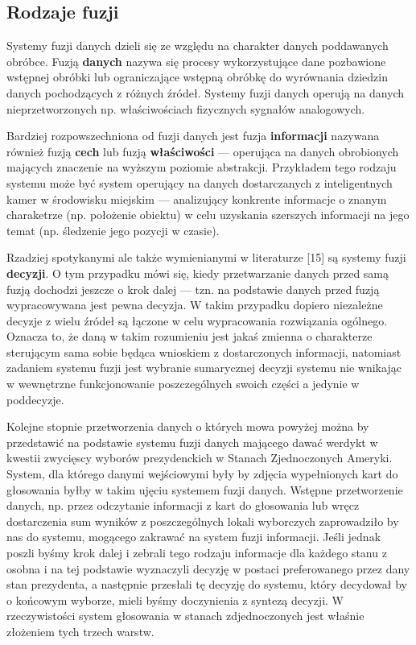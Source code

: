 \subsection{Rodzaje fuzji}
\par{
Systemy fuzji danych dzieli się ze względu na charakter danych poddawanych obróbce. Fuzją \textbf{danych} nazywa się procesy wykorzystujące dane pozbawione wstępnej obróbki lub ograniczające wstępną obróbkę do wyrównania dziedzin danych pochodzących z różnych źródeł. Systemy fuzji danych operują na danych nieprzetworzonych np. właściwościach fizycznych sygnałów analogowych.
}
\par{
Bardziej rozpowszechniona od fuzji danych jest fuzja \textbf{informacji} nazywana również fuzją \textbf{cech} lub fuzją \textbf{właściwości} --- operująca na danych obrobionych mających znaczenie na wyższym poziomie abstrakcji. Przykładem tego rodzaju systemu może być system operujący na danych dostarczanych z inteligentnych kamer w środowisku miejskim --- analizujący konkrente informacje o znanym charaketrze (np. położenie obiektu) w celu uzyskania szerszych informacji na jego temat (np. śledzenie jego pozycji w czasie).
}
\par{
Rzadziej spotykanymi ale także wymienianymi w literaturze [15] są systemy fuzji \textbf{decyzji}. O tym przypadku mówi się, kiedy przetwarzanie danych przed samą fuzją dochodzi jeszcze o krok dalej --- tzn. na podstawie danych przed fuzją wypracowywana jest pewna decyzja. W takim przypadku dopiero niezależne decyzje z wielu źródeł są łączone w celu wypracowania rozwiązania ogólnego. Oznacza to, że daną w takim rozumieniu jest jakaś zmienna o charakterze sterującym sama sobie będąca wnioskiem z dostarczonych informacji, natomiast zadaniem systemu fuzji jest wybranie sumarycznej decyzji systemu nie wnikając w wewnętrzne funkcjonowanie poszczególnych swoich części a jedynie w poddecyzje.
}
\par{
Kolejne stopnie przetworzenia danych o których mowa powyżej można by przedstawić na podstawie systemu fuzji danych mającego dawać werdykt w kwestii zwycięscy wyborów prezydenckich w Stanach Zjednoczonych Ameryki. System, dla którego danymi wejściowymi były by zdjęcia wypełnionych kart do głosowania byłby w takim ujęciu systemem fuzji danych. Wstępne przetworzenie danych, np. przez odczytanie informacji z kart do głosowania lub wręcz dostarczenia sum wyników z poszczególnych lokali wyborczych zaprowadziło by nas do systemu, mogącego zakrawać na system fuzji informacji. Jeśli jednak poszli byśmy krok dalej i zebrali tego rodzaju informacje dla każdego stanu z osobna i na tej podstawie wyznaczyli decyzję w postaci preferowanego przez dany stan prezydenta, a następnie przesłali tę decyzję do systemu, który decydował by o końcowym wyborze, mieli byśmy doczynienia z syntezą decyzji. W rzeczywistości system głosowania w stanach zdjednoczonych jest właśnie złożeniem tych trzech warstw.
}
